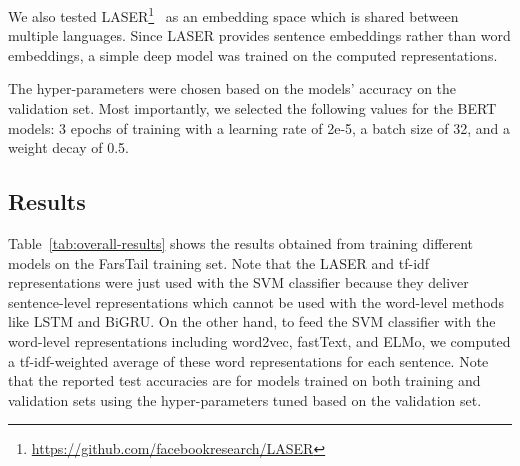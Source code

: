 \documentclass[preprint,12pt]{elsarticle}
\begin{document}
We also tested LASER\footnote{\url{https://github.com/facebookresearch/LASER}}~\citep{artetxe2019massively} as an embedding space which is shared between multiple languages. Since LASER provides sentence embeddings rather than word embeddings, a simple deep model was trained on the computed representations. 

The hyper-parameters were chosen based on the models' accuracy on the validation set. Most importantly, we selected the following values for the BERT models: 3 epochs of training with a learning rate of 2e-5, a batch size of 32, and a weight decay of 0.5. 



\subsection{Results}
\label{subsec:results}

Table~\ref{tab:overall-results} shows the results obtained from training different models on the FarsTail training set. Note that the LASER and tf-idf representations were just used with the SVM classifier because they deliver sentence-level representations which cannot be used with the word-level methods like LSTM and BiGRU. On the other hand, to feed the SVM classifier with the word-level representations including word2vec, fastText, and ELMo, we computed a tf-idf-weighted average of these word representations for each sentence. Note that the reported test accuracies are for models trained on both training and validation sets using the hyper-parameters tuned based on the validation set. 
\end{document}
